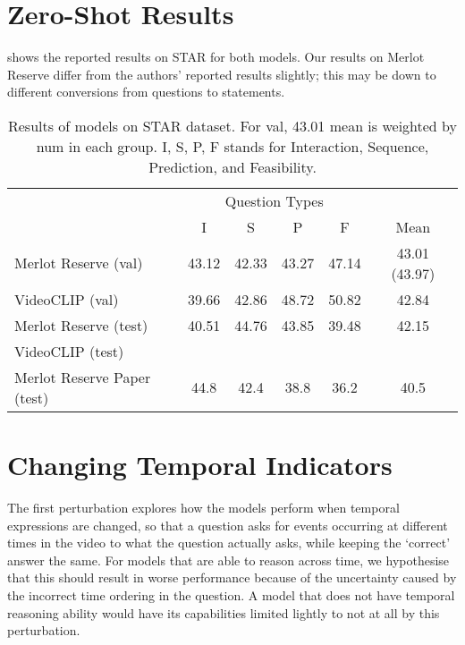 \section{Zero-Shot Results}
\label{sec:zs_star}

 shows the reported results on STAR for both models. Our
results on Merlot Reserve differ from the authors' reported results slightly;
this may be down to different conversions from questions to statements.


\begin{table}[tp] 
    \centering 
    \caption{Results of models on STAR dataset. For val, 43.01 mean is
        weighted by num in each group. I, S, P, F stands for Interaction,
        Sequence, Prediction, and Feasibility.}
    \label{tab:zs_star} 
    \begin{tabular}{lccccc} 
        \toprule
        \multicolumn{1}{c}{}        & \multicolumn{4}{c}{Question Types}                & \multicolumn{1}{c}{} \\
                                      \cmidrule(){2-5}
                                    & I           & S        & P          & F           & Mean \\
        \cmidrule(r){1-1}             \cmidrule(){2-5}                                    \cmidrule(l){6-6}
        Merlot Reserve (val)        & 43.12       & 42.33    & 43.27      & 47.14       & 43.01 (43.97) \\
        VideoCLIP (val)             & 39.66       & 42.86    & 48.72      & 50.82       & 42.84 \\
        Merlot Reserve (test)       & 40.51       & 44.76    & 43.85      & 39.48       & 42.15 \\  
        VideoCLIP (test)            &        &     &       &        &  \\
        \cmidrule(r){1-1}             \cmidrule(){2-5}                                    \cmidrule(l){6-6}
        Merlot Reserve Paper (test) & 44.8        & 42.4     & 38.8       & 36.2        & 40.5 \\
        \bottomrule
    \end{tabular} 
\end{table} 


\section{Changing Temporal Indicators}
\label{sec:change_temp}

The first perturbation explores how the models perform when temporal
expressions are changed, so that a question asks for events occurring at
different times in the video to what the question actually asks, while keeping
the `correct' answer the same. For models that are able to reason across time,
we hypothesise that this should result in worse performance because of the
uncertainty caused by the incorrect time ordering in the question. A model that
does not have temporal reasoning ability would have its capabilities limited
lightly to not at all by this perturbation.

